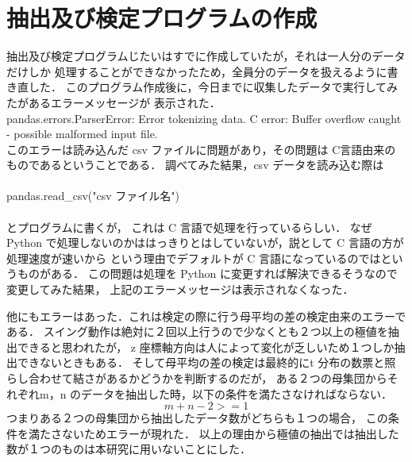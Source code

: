     \section{抽出及び検定プログラムの作成}

        抽出及び検定プログラムじたいはすでに作成していたが，それは一人分のデータだけしか
        処理することができなかったため，全員分のデータを扱えるように書き直した．
        このプログラム作成後に，今日までに収集したデータで実行してみたがあるエラーメッセージが
        表示された．\\

        pandas.errors.ParserError: Error tokenizing data. C error: Buffer overflow caught - possible malformed input file.\\

        このエラーは読み込んだ csv ファイルに問題があり，その問題は C言語由来のものであるということである．
        調べてみた結果，csv データを読み込む際は \\ \\
        pandas.read\_csv("csv ファイル名")\\ \\
        とプログラムに書くが，
        これは C 言語で処理を行っているらしい．
        なぜ Python で処理しないのかははっきりとはしていないが，説として C 言語の方が処理速度が速いから
        という理由でデフォルトが C 言語になっているのではというものがある．
        この問題は処理を Python に変更すれば解決できるそうなので変更してみた結果，
        上記のエラーメッセージは表示されなくなった．

        他にもエラーはあった．これは検定の際に行う母平均の差の検定由来のエラーである．
        スイング動作は絶対に２回以上行うので少なくとも２つ以上の極値を抽出できると思われたが，
        z 座標軸方向は人によって変化が乏しいため１つしか抽出できないときもある．
        そして母平均の差の検定は最終的にt 分布の数票と照らし合わせて結さがあるかどうかを判断するのだが，
        ある２つの母集団からそれぞれm，n のデータを抽出した時，以下の条件を満たさなければならない．
        \begin{equation}
            m + n - 2 >= 1
        \end{equation}
        つまりある２つの母集団から抽出したデータ数がどちらも１つの場合，
        この条件を満たさないためエラーが現れた．
        以上の理由から極値の抽出では抽出した数が１つのものは本研究に用いないことにした．

